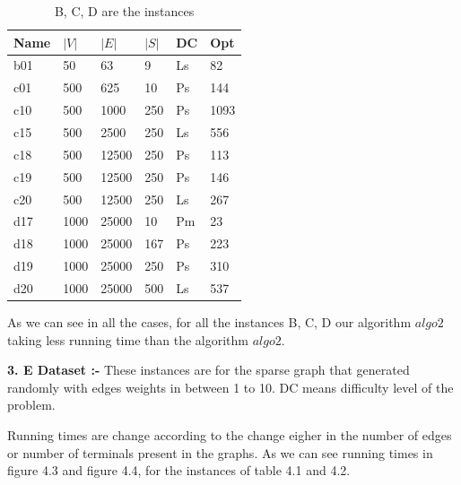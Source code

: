 \begin{table}[H]
\label{my-label}
\begin{center}
\begin{tabular}{|l|l|l|l|l|l|}
\hline
Name & $|V|$      & $|E|$      & $|S|$      & DC         & Opt       \\ \hline
b01    &  50       &  63      &    9   &  Ls         &  82  \\ \hline
c01    &  500       &  625      &    10   &  Ps         &  144  \\ \hline
c10    &  500       &  1000      &    250   &  Ps         &  1093  \\ \hline
c15    &  500       &  2500      &    250   &  Ls         &  556  \\ \hline
c18    &  500       &  12500      &    250   &  Ps         &  113  \\ \hline
c19    &  500       &  12500      &    250   &  Ps         &  146  \\ \hline
c20    &  500       &  12500      &    250   &  Ls         &  267  \\ \hline

d17    &  1000       &  25000      &    10   &  Pm       &  23  \\ \hline
d18    &  1000       &  25000      &    167   &  Ps       &  223  \\ \hline

d19    &  1000       &  25000      &    250   &  Ps       &  310  \\ \hline
d20    &  1000       &  25000      &    500   &  Ls      &   537  \\ \hline
\end{tabular}
\end{center}
\caption{B, C, D are the instances}
\end{table}

As we can see in all the cases, for all the instances B, C, D our algorithm $algo2$ taking less running time than the algorithm $algo2$.


\textbf{3. E Dataset :-} These instances are for the sparse graph that generated randomly with edges weights in between 1 to 10. DC means difficulty level of the problem.

Running times are change according to the change eigher in the number of edges or number of terminals present in the graphs. As we can see running times in figure 4.3 and figure 4.4, for the instances of table 4.1 and 4.2.  
 
